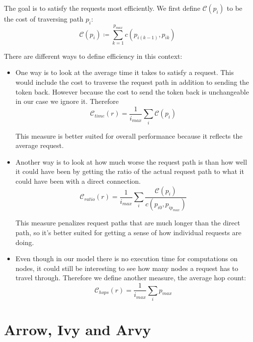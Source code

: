 \documentclass[a4paper, oneside]{discothesis}
\begin{document}
The goal is to satisfy the requests most efficiently. We first define $\mathcal{C}(p_i)$ to be the cost of traversing path $p_i$:
\begin{equation}
\mathcal{C}(p_i)\coloneqq\sum_{k=1}^{p_{max}}c(p_{i(k-1)}, p_{ik})
\end{equation}

There are different ways to define efficiency in this context:
\begin{itemize}
\item
  One way is to look at the average time it takes to satisfy a request. This would include the cost to traverse the request path in addition to sending the token back. However because the cost to send the token back is unchangeable in our case we ignore it. Therefore
  \begin{equation}
    \mathcal{C}_{time}(r) = \frac{1}{i_{max}}\sum_i\mathcal{C}(p_i)
  \end{equation}

  This measure is better suited for overall performance because it reflects the average request.
  
\item
  Another way is to look at how much worse the request path is than how well it could have been by getting the ratio of the actual request path to what it could have been with a direct connection.
  \begin{equation}
    \mathcal{C}_{ratio}(r) = \frac{1}{i_{max}}\sum_i\frac{\mathcal{C}(p_i)}{c(p_{i0},p_{ip_{max}})}
  \end{equation}

  This measure penalizes request paths that are much longer than the direct path, so it's better suited for getting a sense of how individual requests are doing.

\item
  Even though in our model there is no execution time for computations on nodes, it could still be interesting to see how many nodes a request has to travel through. Therefore we define another measure, the average hop count:
  \begin{equation}
    \mathcal{C}_{hops}(r) = \frac{1}{i_{max}}\sum_ip_{max}
  \end{equation}
\end{itemize}


\section{Arrow, Ivy and Arvy}
\end{document}
